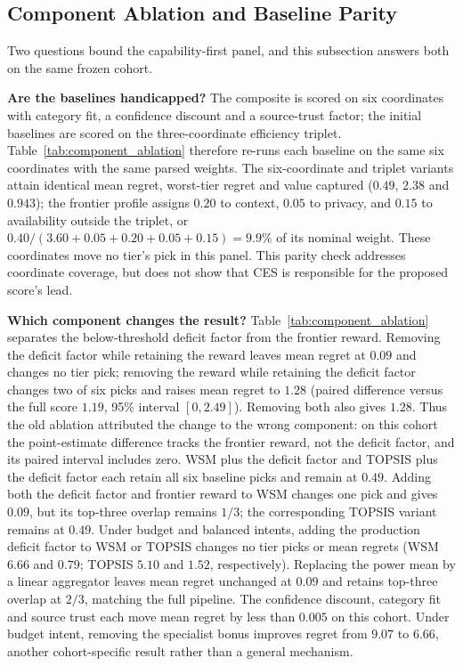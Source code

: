 \documentclass[pdflatex,sn-mathphys-num]{sn-jnl}
\theoremstyle{thmstyleone}
\theoremstyle{thmstylethree}
\begin{document}
\subsection{Component Ablation and Baseline Parity}\label{subsec:parity}

Two questions bound the capability-first panel, and this subsection answers both on the same frozen cohort.

\textbf{Are the baselines handicapped?} The composite is scored on six coordinates with category fit, a confidence discount and a source-trust factor; the initial baselines are scored on the three-coordinate efficiency triplet. Table~\ref{tab:component_ablation} therefore re-runs each baseline on the same six coordinates with the same parsed weights. The six-coordinate and triplet variants attain identical mean regret, worst-tier regret and value captured ($0.49$, $2.38$ and $0.943$); the frontier profile assigns $0.20$ to context, $0.05$ to privacy, and $0.15$ to availability outside the triplet, or $0.40/(3.60+0.05+0.20+0.05+0.15)=9.9\%$ of its nominal weight. These coordinates move no tier's pick in this panel. This parity check addresses coordinate coverage, but does not show that CES is responsible for the proposed score's lead.

\textbf{Which component changes the result?} Table~\ref{tab:component_ablation} separates the below-threshold deficit factor from the frontier reward. Removing the deficit factor while retaining the reward leaves mean regret at $0.09$ and changes no tier pick; removing the reward while retaining the deficit factor changes two of six picks and raises mean regret to $1.28$ (paired difference versus the full score $1.19$, 95\% interval $[0,2.49]$). Removing both also gives $1.28$. Thus the old ablation attributed the change to the wrong component: on this cohort the point-estimate difference tracks the frontier reward, not the deficit factor, and its paired interval includes zero. WSM plus the deficit factor and TOPSIS plus the deficit factor each retain all six baseline picks and remain at $0.49$. Adding both the deficit factor and frontier reward to WSM changes one pick and gives $0.09$, but its top-three overlap remains $1/3$; the corresponding TOPSIS variant remains at $0.49$. Under budget and balanced intents, adding the production deficit factor to WSM or TOPSIS changes no tier picks or mean regrets (WSM $6.66$ and $0.79$; TOPSIS $5.10$ and $1.52$, respectively). Replacing the power mean by a linear aggregator leaves mean regret unchanged at $0.09$ and retains top-three overlap at $2/3$, matching the full pipeline. The confidence discount, category fit and source trust each move mean regret by less than $0.005$ on this cohort. Under budget intent, removing the specialist bonus improves regret from $9.07$ to $6.66$, another cohort-specific result rather than a general mechanism.
\end{document}
